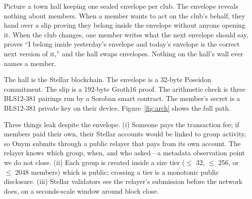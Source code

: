 \documentclass{IEEEcsmag}
\begin{document}
Picture a town hall keeping one sealed envelope per club. The envelope reveals nothing about members. When a member wants to act on the club's behalf, they hand over a slip proving they belong inside the envelope without anyone opening it. When the club changes, one member writes what the next envelope should say, proves ``I belong inside yesterday's envelope and today's envelope is the correct next version of it,'' and the hall swaps envelopes. Nothing on the hall's wall ever names a member.

The hall is the Stellar blockchain. The envelope is a 32-byte Poseidon commitment. The slip is a 192-byte Groth16 proof. The arithmetic check is three BLS12-381 pairings run by a Soroban smart contract. The member's secret is a BLS12-381 private key on their device. Figure~\ref{fig:arch} shows the full path.

Three things leak despite the envelope. (i) Someone pays the transaction fee; if members paid their own, their Stellar accounts would be linked to group activity, so Onym submits through a public relayer that pays from its own account. The relayer knows which group, when, and who asked---a metadata observation point we do not close. (ii) Each group is created inside a size tier ($\leq$ 32, $\leq$ 256, or $\leq$ 2048 members) which is public; crossing a tier is a monotonic public disclosure. (iii) Stellar validators see the relayer's submission before the network does, on a seconds-scale window around block close.
\end{document}
